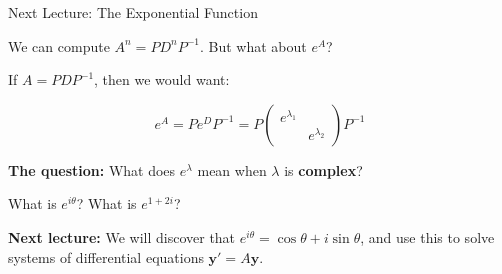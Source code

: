 \documentclass[10pt]{beamer}
\theoremstyle{definition}
\newcommand{\x}[1]{\alert{\textbf{#1}}}
\begin{document}
\begin{frame}{Next Lecture: The Exponential Function}

We can compute $A^n = PD^nP^{-1}$. But what about $e^A$?

\vfill\pause

If $A = PDP^{-1}$, then we would want:

$$e^A = Pe^DP^{-1} = P\begin{pmatrix}e^{\lambda_1} & \\ & e^{\lambda_2}\end{pmatrix}P^{-1}$$

\vfill\pause

\x{The question:} What does $e^{\lambda}$ mean when $\lambda$ is \x{complex}?

\vfill

What is $e^{i\theta}$? What is $e^{1+2i}$?

\vfill\pause

\x{Next lecture:} We will discover that $e^{i\theta} = \cos\theta + i\sin\theta$, and use this to solve systems of differential equations $\mathbf{y}' = A\mathbf{y}$.

\end{frame}
\end{document}
